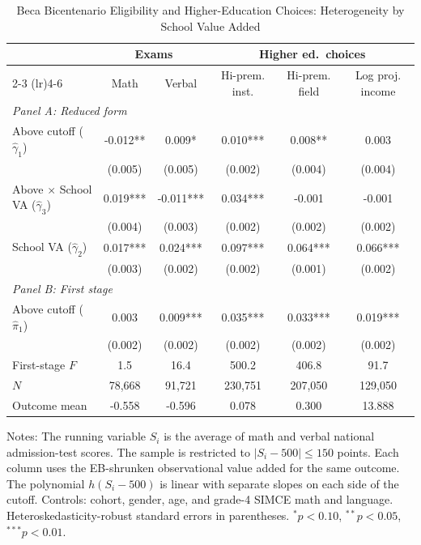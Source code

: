 \begin{table}[!htbp]
\centering
\caption{Beca Bicentenario Eligibility and Higher-Education Choices: Heterogeneity by School Value Added}
\label{tab:bicentenario-rd-va-interaction}
\begin{tabular}{lccccc}
\toprule
 & \multicolumn{2}{c}{Exams} & \multicolumn{3}{c}{Higher ed.~choices} \\
\cmidrule(lr){2-3} \cmidrule(lr){4-6}
 & Math & Verbal & Hi-prem. inst. & Hi-prem. field & Log proj. income \\
\midrule
\multicolumn{6}{l}{\textit{Panel A: Reduced form}} \\[2pt]
Above cutoff ($\hat{\gamma}_1$) & -0.012** & 0.009* & 0.010*** & 0.008** & 0.003 \\
        & (0.005) & (0.005) & (0.002) & (0.004) & (0.004) \\
Above $\times$ School VA ($\hat{\gamma}_3$) & 0.019*** & -0.011*** & 0.034*** & -0.001 & -0.001 \\
        & (0.004) & (0.003) & (0.002) & (0.002) & (0.002) \\
School VA ($\hat{\gamma}_2$) & 0.017*** & 0.024*** & 0.097*** & 0.064*** & 0.066*** \\
        & (0.003) & (0.002) & (0.002) & (0.001) & (0.002) \\
\midrule
\multicolumn{6}{l}{\textit{Panel B: First stage}} \\[2pt]
Above cutoff ($\hat{\pi}_1$) & 0.003 & 0.009*** & 0.035*** & 0.033*** & 0.019*** \\
        & (0.002) & (0.002) & (0.002) & (0.002) & (0.002) \\
First-stage $F$ & 1.5 & 16.4 & 500.2 & 406.8 & 91.7 \\
\midrule
$N$ &  78,668 &  91,721 & 230,751 & 207,050 & 129,050 \\
Outcome mean & -0.558 & -0.596 & 0.078 & 0.300 & 13.888 \\
\bottomrule
\end{tabular}
\par\medskip\footnotesize
\begin{minipage}{\textwidth}
Notes: The running variable $S_i$ is the average of math and verbal national admission-test scores. The sample is restricted to $|S_i - 500| \leq 150$ points. Each column uses the EB-shrunken observational value added for the same outcome. The polynomial $h(S_i - 500)$ is linear with separate slopes on each side of the cutoff. Controls: cohort, gender, age, and grade-4 SIMCE math and language. Heteroskedasticity-robust standard errors in parentheses. $^{*}p<0.10$, $^{**}p<0.05$, $^{***}p<0.01$.
\end{minipage}
\end{table}
